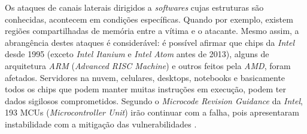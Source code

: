 \documentclass[
	article,			    %
	12pt,				    %
	oneside,			    %
	a4paper,			    %
	chapter=TITLE,		    %
	section=TITLE,		    %
	subsection=TITLE,	    %
	english,			    %
	brazil,				    %
	sumario=tradicional
]{abntex2}
\begin{document}
\begin{comment}
\subsection{Tema}
A execução especulativa é uma técnica de projeto de microarquitetura, que proporciona o aprimoramento da velocidade de processamento nos processadores modernos. Está presente em muitos processadores de vários fabricantes, incluindo \emph{Intel}, \emph{AMD} e \emph{ARM Holdings}. Esta técnica consiste na estimativa e execução de instruções, com valores ainda não conhecidos pela CPU, durante um período curto de inatividade (que acontece durante a espera de valores reais, provenientes da memória principal, que é mais lenta do que a memória cache).

Do ponto de vista de funcional, esta especulação traria problemas se os resultados de especulações incorretas fossem efetivados. Porém, quando a verdadeira informação é recuperada, a CPU verifica a exatidão da suposição e descarta o ``caminho'' (fluxo de execução) que foi executado incorretamente. Eliminando valores nos registradores, ou alterações em variáveis por exemplo.

Apoderando-se do conhecimento microarquitetural necessário para se conhecer em quais situações e em quais instruções a execução especulativa ocorre, é possível um atacante forçar ou induzir a execução especulativa, por ``viciar'' o processador em uma cadeia de especulações e transferir as informações especuladas para um canal alternativo (como por exemplo, a memória cache). Caso a transferência seja bem-sucedida, o atacante efetua a leitura dos dados presentes no canal alternativo, neste caso na memória cache, medindo o tempo de acesso aos dados que foram especulados e comparando-os com um tempo médio de acesso (à memória cache) conhecido. Caso a informação demore de ser recuperada (baseando-se na média), supõe-se que ela não se encontra na memória cache. Caso contrário, o atacante acertou a suposição da informação correta.
\end{comment}
Os ataques de canais laterais dirigidos a \emph{softwares} cujas estruturas são conhecidas, acontecem em condições específicas. Quando por exemplo, existem regiões compartilhadas de memória entre a vítima e o atacante. Mesmo assim, a abrangência destes ataques é considerável: é possível afirmar que chips da \emph{Intel} desde 1995 (exceto \emph{Intel Itanium} e \emph{Intel Atom} antes de 2013), alguns de arquitetura \emph{ARM} (\emph{Advanced RISC Machine}) e outros feitos pela \emph{AMD}, foram afetados. Servidores na nuvem, celulares, desktops, notebooks e basicamente todos os chips que podem manter muitas instruções em execução, podem ter dados sigilosos comprometidos. Segundo o \emph{Microcode Revision Guidance} da \emph{Intel}, 193 MCUs (\emph{Microcontroller Unit}) irão continuar com a falha, pois apresentaram instabilidade com a mitigação das vulnerabilidades \cite{intel-mug}.
\end{document}
